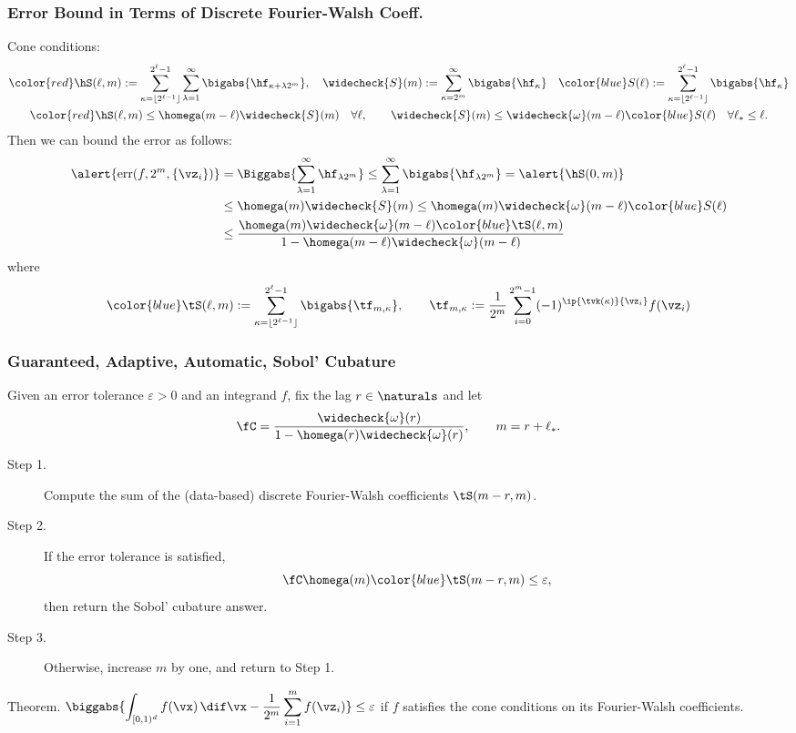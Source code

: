 \documentclass[10pt,compress]{beamer} %
\DeclareMathOperator{\err}{err}
\newcommand{\cube}{[0,1)^d}
\newcommand{\wcS}{\widecheck{S}}
\newcommand{\wcomega}{\widecheck{\omega}}
\begin{document}
\begin{frame}\frametitle{Error Bound in Terms of Discrete Fourier-Walsh Coeff.}
Cone conditions:
\vspace{-1ex}
\begin{gather*}
{\color{red}\hS(\ell,m)}  := \sum_{\kappa=\lfloor 2^{\ell-1} \rfloor}^{2^{\ell}-1} \sum_{\lambda=1}^{\infty} \bigabs{ \hf_{\kappa+\lambda 2^{m}}}, \quad
\wcS(m) :=
\sum_{\kappa=2^{m}}^{\infty} \bigabs{\hf_{\kappa}} \quad
{\color{blue}S(\ell)} :=  \sum_{\kappa=\lfloor 2^{\ell-1} \rfloor}^{2^{\ell}-1} \bigabs{\hf_{\kappa}}\\
{\color{red}\hS(\ell,m)} \le \homega(m-\ell) \wcS(m) \quad \forall \ell, \qquad
\wcS(m) \le \wcomega(m-\ell) {\color{blue}S(\ell)} \quad \forall \ell_* \le \ell.
\end{gather*}
Then we can bound the error as follows:
\begin{align*}
\alert{\err(f,2^m, \{\vz_i\})} & = \Biggabs{\sum_{\lambda=1}^{\infty} \hf_{\lambda 2^{m}}} \le \sum_{\lambda=1}^{\infty} \bigabs{\hf_{\lambda 2^{m}}}
= \alert{\hS(0,m)}\\
& \le \homega(m) \wcS(m) \le \homega(m) \wcomega(m-\ell) {\color{blue}S(\ell)} \\
& \le \frac{\homega(m) \wcomega(m-\ell) {\color{blue}\tS(\ell,m)}}{1 - \homega(m-\ell) \wcomega(m-\ell)}
\end{align*}
where
\[
{\color{blue}\tS(\ell,m)} :=\sum_{\kappa=\lfloor 2^{\ell-1} \rfloor}^{2^{\ell}-1} \bigabs{\tf_{m,\kappa}}, \qquad \tf_{m,\kappa}:= \frac{1}{2^m} \sum_{i=0}^{2^m-1} (-1)^{\ip{\tvk(\kappa)}{\vz_i}} f(\vz_i)
\]
\end{frame}

\begin{frame}\frametitle{Guaranteed, Adaptive, Automatic, Sobol' Cubature}
Given an \alert{error tolerance} $\varepsilon>0$ and an integrand $f$, fix the lag $r \in \naturals$ and let
\[
\fC=\frac{\wcomega(r)}{1 - \homega(r) \wcomega(r)}, \qquad m=r+\ell_*.
\]
\begin{description}
\item[Step 1.]  Compute the sum of the (data-based) {\color{blue}discrete Fourier-Walsh coefficients $\tS(m-r,m)$}.
\item[Step 2.] If the \alert{error tolerance} is satisfied,
\[
\fC \homega(m) {\color{blue}\tS(m-r,m)} \le \varepsilon,
\]
then return the Sobol' cubature answer.

\item[Step 3.]  Otherwise, increase $m$ by one, and return to Step 1.

\end{description}

\alert{Theorem.} $\displaystyle \biggabs{\int_{\cube} f(\vx) \, \dif \vx - \frac{1}{2^m} \sum_{i=1}^m f(\vz_i)} \le \varepsilon$ if $f$ satisfies the \alert{cone} conditions on its Fourier-Walsh coefficients.

\end{frame}
\end{document}
